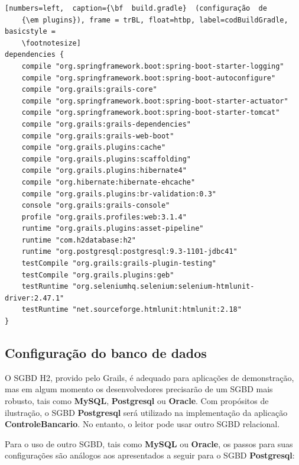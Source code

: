 \begin{lstlisting}[numbers=left,  caption={\bf  build.gradle}  (configuração  de
    {\em plugins}), frame = trBL, float=htbp, label=codBuildGradle, basicstyle =
    \footnotesize] 
dependencies {
    compile "org.springframework.boot:spring-boot-starter-logging"
    compile "org.springframework.boot:spring-boot-autoconfigure"
    compile "org.grails:grails-core"
    compile "org.springframework.boot:spring-boot-starter-actuator"
    compile "org.springframework.boot:spring-boot-starter-tomcat"
    compile "org.grails:grails-dependencies"
    compile "org.grails:grails-web-boot"
    compile "org.grails.plugins:cache"
    compile "org.grails.plugins:scaffolding"
    compile "org.grails.plugins:hibernate4"
    compile "org.hibernate:hibernate-ehcache"
    compile "org.grails.plugins:br-validation:0.3"
    console "org.grails:grails-console"
    profile "org.grails.profiles:web:3.1.4"
    runtime "org.grails.plugins:asset-pipeline"
    runtime "com.h2database:h2"
    runtime "org.postgresql:postgresql:9.3-1101-jdbc41"
    testCompile "org.grails:grails-plugin-testing"
    testCompile "org.grails.plugins:geb"
    testRuntime "org.seleniumhq.selenium:selenium-htmlunit-driver:2.47.1"
    testRuntime "net.sourceforge.htmlunit:htmlunit:2.18"
}
\end{lstlisting}

\newpage

\subsection{Configuração do banco de dados}

\vspace{0.2cm}

O SGBD H2, provido pelo Grails,  é adequado para aplicações de demonstração, mas
em algum  momento os  desenvolvedores precisarão de  um SGBD mais  robusto, tais
como  {\bf  MySQL},  {\bf  Postgresql}  ou  {\bf  Oracle}.   Com  propósitos  de
ilustração, o SGBD {\bf Postgresql} será utilizado na implementação da aplicação
{\bf ControleBancario}. No entanto, o leitor pode usar outro SGBD relacional.

\vspace{0.2cm}

Para o uso de outro SGBD, tais  como {\bf MySQL} ou {\bf Oracle}, os passos para
suas  configurações são  análogos aos  apresentados a  seguir para  o  SGBD {\bf
  Postgresql}: 

\vspace{0.2cm}

